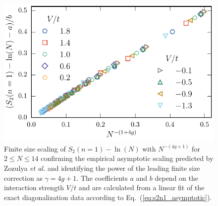 \begin{figure}[h]
\begin{center}
\includegraphics[width=0.7\columnwidth]{Images/ParticleEntanglement/Scaling_of_PPE_In_TLL_phase.pdf}
\end{center}
\caption{Finite size scaling of $S_2(n=1)-\ln(N)$ with $N^{-(4g+1)}$
for $2 \leq N \leq 14$ confirming the empirical asymptotic scaling predicted by
Zozulya \emph{et al.} \cite{Zozulya:2007jw} and identifying the power of the
leading finite size correction as $\gamma = 4g + 1$.  The coefficients $a$ and
$b$ depend on the interaction strength $V/t$ and are calculated from a linear
fit of the exact diagonalization data according to Eq.~(\ref{eq:s2n1_asymptotic}).} 
\label{fig:Scaling_of_PPE_In_TLL_phase}
\end{figure}
%

